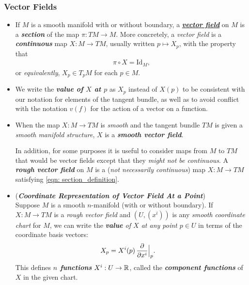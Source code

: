 \documentclass[11pt]{article}
\begin{document}
\subsubsection{Vector Fields}
\begin{itemize}
\item \begin{definition}
If $M$ is a smooth manifold with or without boundary, a \underline{\emph{\textbf{vector field}}} on $M$ is a \emph{\textbf{section}} of the map $\pi: TM \rightarrow M$. More concretely, a \emph{vector field} is a \emph{\textbf{continuous}} map $X: M \rightarrow TM$, usually written $p \mapsto X_p$, with the property that
\begin{align}
\pi \circ X = \text{Id}_{M}, \label{eqn: section_definition}
\end{align} or \emph{equivalently}, $X_p \in T_{p}M$ for each $p \in M$. 
\end{definition}

\item \begin{remark}
We write the \emph{\textbf{value of $X$ at $p$}} as $X_p$ instead of $X(p)$ to be consistent with our notation for elements of the tangent bundle, as well as to avoid conflict with the notation $v(f)$ for the action of a vector on a function.
\end{remark}

\item \begin{definition}
When the map $X: M \rightarrow TM$ is \emph{smooth} and the tangent bundle $TM$ is given a \emph{smooth manifold structure},  $X$ is a \textbf{\emph{smooth vector field}}. 

In addition, for some purposes it is useful to consider maps from $M$ to $TM$ that would be vector fields except that they \emph{might not be continuous}. A \emph{\textbf{rough vector field}} on $M$ is a (\emph{not necessarily continuous}) map $X: M \rightarrow TM$ satisfying \eqref{eqn: section_definition}.
\end{definition}

\item \begin{remark} (\emph{\textbf{Coordinate Representation of Vector Field At a Point}})\\
Suppose $M$ is a smooth $n$-manifold (with or without boundary). If $X: M \rightarrow TM$ is a \emph{rough vector field} and $(U, (x^i)) $ is any \emph{smooth coordinate chart} for $M$, we can write the \emph{\textbf{value} of $X$ at any point $p \in U$} in terms of the coordinate basis vectors:
\begin{align}
X_{p} &= X^{i}(p)\,\frac{\partial }{ \partial x^{i}}\Bigr|_{p}.  \label{eqn: vector_fields_at_p_coordinate_expansion}
\end{align} 
This defines \textbf{\emph{$n$ functions}} $X^i: U \rightarrow {\mathbb R}$, called the \emph{\textbf{component functions}} of $X$ in the given chart.
\end{remark}


\end{itemize}
\end{document}
